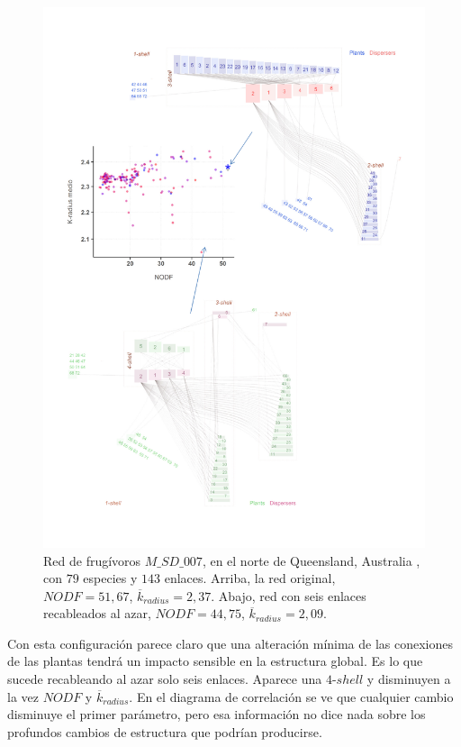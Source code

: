 \clearpage
\begin{figure}[ht!]
\centering
\includegraphics[scale=0.75]{Figures/VIS_SD_007.pdf}
\caption {Red de frugívoros $M\_SD\_007$, en el norte de Queensland, Australia \cite{crome1975ecology}, con $79$ especies y $143$ enlaces. Arriba, la red original, $NODF = 51,67$, $\overline k_{radius} = 2,37$. Abajo, red con seis enlaces recableados al azar, $NODF = 44,75$, $\overline k_{radius} = 2,09$.}
\label{fig:VIS_SD_007}
\end{figure}

\clearpage
Con esta configuración parece claro que una alteración mínima de las conexiones de las plantas tendrá un impacto sensible en la estructura global. Es lo que sucede recableando al azar solo seis enlaces. Aparece una $4$-$shell$ y disminuyen a la vez $NODF$ y  $\overline k_{radius}$. En el diagrama de correlación se ve que cualquier cambio disminuye el primer parámetro, pero esa información no dice nada sobre los profundos cambios de estructura que podrían producirse.

